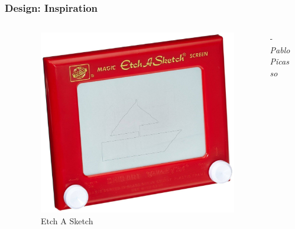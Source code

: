\documentclass{beamer}
\begin{document}
\begin{frame}
\frametitle{Design: Inspiration}

\begin{columns}

\begin{column}{0.05\textwidth}
\end{column}

\begin{column}{0.45\textwidth}
\begin{figure}
	\includegraphics[scale=0.1]{images/etch_a_sketch.jpg}
	\caption{Etch A Sketch}
\end{figure}
\end{column}

\begin{column}{0.45\textwidth}
\begin{center}
\begin{Large}
\end{Large}
\end{center}
\begin{flushright}
{- \textit{Pablo Picasso }}
\end{flushright}
\end{column}

\begin{column}{0.05\textwidth}
\end{column}

\end{columns}

\end{frame}
\end{document}
